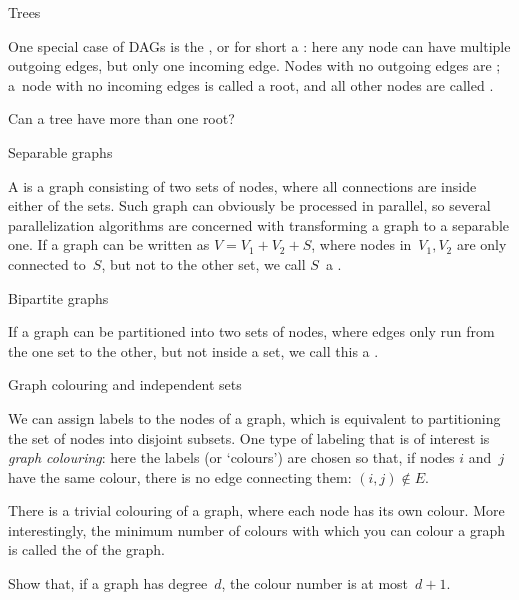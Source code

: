  {Trees}

One special case of \acp{DAG} is the
,
or for short a
:
here any node can have multiple outgoing edges,
but only one incoming edge.
Nodes with no outgoing edges are ;
a~node with no incoming edges is called a root,
and all other nodes are called .

\begin{exercise}
 Can a tree have more than one root?
\end{exercise}

 {Separable graphs}

A
is a graph consisting of two sets of nodes,
where all connections are inside either of the sets.
Such graph can obviously be processed in parallel,
so several parallelization algorithms are concerned
with transforming a graph to a separable one.
If a graph can be written as $V=V_1+V_2+S$,
where nodes in~$V_1,V_2$ are only connected to~$S$,
but not to the other set,
we call $S$~a .

 {Bipartite graphs}
\label{app:bipartite}

If a graph can be partitioned into two sets of nodes,
where edges only run from the one set to the other,
but not inside a set,
we call this a %
.

 {Graph colouring and independent sets}
\label{sec:independent}

We can assign labels to the nodes of a graph, which is equivalent to
partitioning the set of nodes into disjoint subsets. One type of
labeling that is of interest is \emph{graph colouring}: here the
labels (or `colours') are chosen so that, if nodes $i$ and~$j$ have
the same colour, there is no edge connecting them: $(i,j)\not\in
E$. 

There is a trivial colouring of a graph, where each node has its own
colour. More interestingly,
the minimum number of colours with which you can colour a graph is
called the  of the graph.

\begin{exercise}
  Show that, if a graph has degree~$d$, the colour number is at
  most~$d+1$.
\end{exercise}

